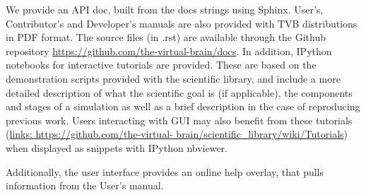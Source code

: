 We provide an API doc, built from the docs strings using Sphinx.
User's, Contributor's and Developer's manuals are also provided with TVB
distributions in PDF format. The source files (in .rst) are available
through the Github repository \url{https://github.com/the-virtual-brain/docs}.  
In addition, IPython notebooks\citep{PerezGranger_2007}
for interactive tutorials are provided. These are based on the
demonstration scripts provided with the scientific library, and
include a more detailed description of what the scientific goal is (if
applicable), the components and stages of a simulation as well as a
brief description in the case of reproducing previous work. Users
interacting with \TVB GUI may also benefit from these tutorials
(\url{links: https://github.com/the-virtual-
brain/scientific_library/wiki/Tutorials}) when displayed as snippets
with IPython nbviewer. 

Additionally, the user interface provides an online help overlay, that pulls
information from the User's manual.


